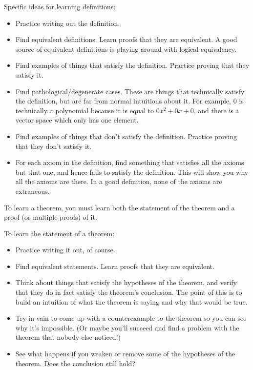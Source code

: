 \documentclass[12pt]{article}
\begin{document}
Specific ideas for learning definitions:
\begin{itemize}
  \item Practice writing out the definition. 
  \item Find equivalent definitions.  Learn proofs that they are
    equivalent. A good source of equivalent definitions is playing
    around with logical equivalency. 
  \item Find examples of things that satisfy the definition.  Practice
    proving that they satisfy it. 
  \item Find pathological/degenerate cases.  These are things that
    technically satisfy the definition, but are far from normal
    intuitions about it.  For example, $0$ is technically a polynomial
    because it is equal to $0x^2+0x+0$, and there is a vector space
    which only has one element. 
  \item Find examples of things that don't satisfy the definition.
    Practice proving that they don't satisfy it. 
  \item For each axiom in the definition, find something that
    satisfies all the axioms but that one, and hence fails to satisfy
    the definition.  This will show you why all the axioms are there.
    In a good definition, none of the axioms are extraneous. 
\end{itemize}

To learn a theorem, you must learn both the statement of the
theorem and a proof (or multiple proofs) of it.

To learn the statement of a theorem:
\begin{itemize}
  \item Practice writing it out, of course. 
  \item Find equivalent statements.  Learn proofs that they are equivalent. 
  \item Think about things that satisfy the hypotheses of the theorem,
    and verify that they do in fact satisfy the theorem's
    conclusion. The point of this is to build an intuition of what the
    theorem is saying and why that would be true.  
  \item Try in vain to come up with a counterexample to the theorem so
    you can see why it's impossible. (Or maybe you'll succeed and find
    a problem with the theorem that nobody else noticed!)
  \item See what happens if you weaken or remove some of the
    hypotheses of the theorem.  Does the conclusion still hold?
\end{itemize}
\end{document}
